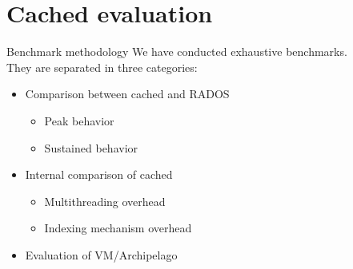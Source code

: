 \section{Cached evaluation}

\begin{frame}{Benchmark methodology}
We have conducted exhaustive benchmarks.\\
They are separated in three categories:

\begin{itemize}
	\item Comparison between cached and RADOS
		\begin{itemize}
			\item Peak behavior
			\item Sustained behavior
		\end{itemize}
	\item Internal comparison of cached
		\begin{itemize}
			\item Multithreading overhead
			\item Indexing mechanism overhead
		\end{itemize}
	\item Evaluation of VM/Archipelago
\end{itemize}


\end{frame}

